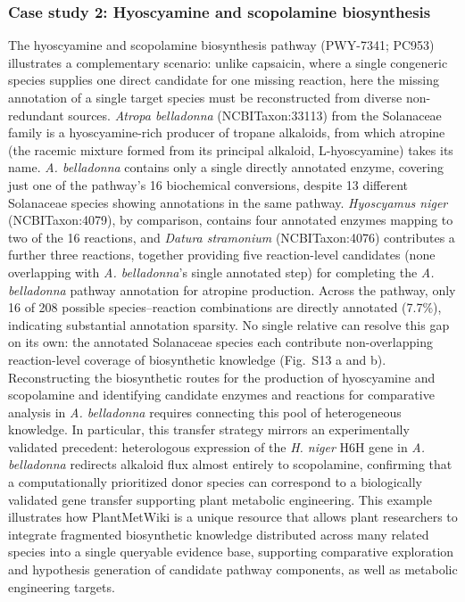 \documentclass[11pt,a4paper]{article}
\begin{document}
\subsubsection*{Case study 2: Hyoscyamine and scopolamine biosynthesis}
\vspace*{-1em}
The hyoscyamine and scopolamine biosynthesis pathway (PWY-7341; PC953) illustrates a complementary
scenario: unlike capsaicin, where a single congeneric species supplies one direct candidate for one
missing reaction, here the missing annotation of a single target species must be reconstructed from diverse non-redundant sources. \textit{Atropa belladonna} (NCBITaxon:33113) from
the Solanaceae family is a hyoscyamine-rich producer of tropane alkaloids, from which atropine (the racemic mixture formed from its principal alkaloid, L-hyoscyamine) takes its name. \textit{A.
belladonna} contains only a single directly annotated enzyme, covering just one of the pathway's 16
biochemical conversions, despite 13 different Solanaceae species showing annotations in the same pathway.
\textit{Hyoscyamus niger} (NCBITaxon:4079), by comparison, contains four annotated enzymes mapping to
two of the 16 reactions, and \textit{Datura stramonium} (NCBITaxon:4076) contributes a further three
reactions, together providing five reaction-level candidates (none overlapping with \textit{A.
belladonna}'s single annotated step) for completing the \textit{A. belladonna} pathway annotation for atropine production.
Across the pathway, only 16 of 208 possible species--reaction combinations are directly annotated
(7.7\%), indicating substantial annotation sparsity. No single relative can resolve this gap on its
own: the annotated Solanaceae species each contribute non-overlapping reaction-level coverage of
biosynthetic knowledge (Fig.~S13 a and b). Reconstructing the biosynthetic routes for the production of hyoscyamine and scopolamine and identifying candidate enzymes and reactions for comparative analysis in \textit{A. belladonna} requires connecting this pool of heterogeneous knowledge. In particular, this transfer strategy mirrors an
experimentally validated precedent: heterologous expression of the \textit{H. niger} H6H gene in
\textit{A. belladonna} redirects alkaloid flux almost entirely to scopolamine, confirming that a
computationally prioritized donor species can correspond to a biologically validated gene transfer
supporting plant metabolic engineering. This example illustrates how PlantMetWiki is a unique resource that allows plant researchers to integrate
fragmented biosynthetic knowledge distributed across many related species into a single queryable
evidence base, supporting comparative exploration and hypothesis generation of candidate pathway
components, as well as metabolic engineering targets.
\end{document}
